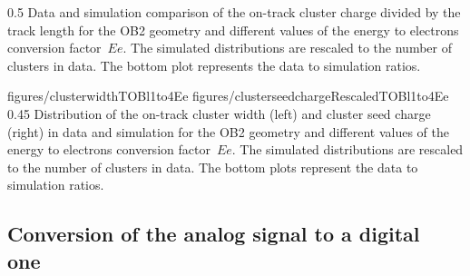                  {0.5}       %
                 { Data and simulation comparison of the on-track cluster charge divided by the track length for the OB2 geometry and different values of the energy to electrons conversion factor~$Ee$. The simulated distributions are rescaled to the number of clusters in data.  The bottom plot represents the data to simulation ratios. }

                 {figures/clusterwidthTOBl1to4Ee}
                 {figures/clusterseedchargeRescaledTOBl1to4Ee} %
                 {0.45}       %
                 { Distribution of the on-track cluster width (left) and cluster seed charge (right) in data and simulation for the OB2 geometry and different values of the energy to electrons conversion factor~$Ee$.  The simulated distributions are rescaled to the number of clusters in data.  The bottom plots represent the data to simulation ratios. }


\subsection{Conversion of the analog signal to a digital one~\label{sec:digitize}}

